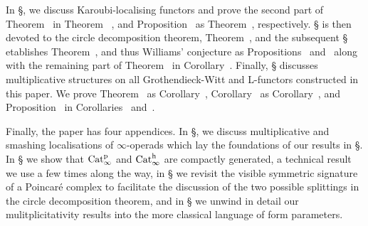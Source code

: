 In \S{}, we discuss Karoubi-localising functors and prove %
the second part of Theorem~ in Theorem ~, and Proposition~ as Theorem~, respectively. \S{} is then devoted to the circle decomposition theorem, Theorem~, and the subsequent \S{} etablishes Theorem~, and thus Williams' conjecture as Propositions~ and~ along with the remaining part of Theorem~ in Corollary~.
Finally, \S{} discusses multiplicative structures on all Grothendieck-Witt and L-functors constructed in this paper. We prove Theorem~ as Corollary~, Corollary~ as Corollary~, and Proposition~ in Corollaries~ and~. 

Finally, the paper has four appendices. In \S{}, we discuss multiplicative and smashing localisations of $\infty$-operads which lay the foundations of our results in \S{}. %
In \S{} we show that $\mathrm{Cat}^{\mathrm p}_\infty$ and $\mathrm{Cat}^\mathrm{h}_\infty$ are compactly generated, a technical result we use a few times along the way, in \S{} we revisit the visible symmetric signature of a Poincar\'e complex to facilitate the discussion of the two possible splittings in the circle decomposition theorem, and in \S{} we unwind in detail our mulitplicitativity results into the more classical language of form parameters. %
